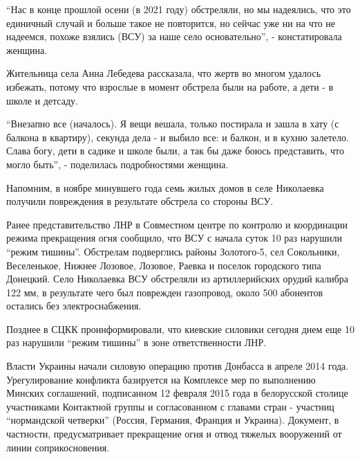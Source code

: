\enquote{Нас в конце прошлой осени (в 2021 году) обстреляли, но мы надеялись, что это
единичный случай и больше такое не повторится, но сейчас уже ни на что не
надеемся, похоже взялись (ВСУ) за наше село основательно}, - констатировала
женщина.


Жительница села Анна Лебедева рассказала, что жертв во многом удалось избежать,
потому что взрослые в момент обстрела были на работе, а дети - в школе и
детсаду.


\enquote{Внезапно все (началось). Я вещи вешала, только постирала и зашла в хату (с
балкона в квартиру), секунда дела - и выбило все: и балкон, и в кухню залетело.
Слава богу, дети в садике и школе были, а так бы даже боюсь представить, что
могло быть}, - поделилась подробностями женщина.


Напомним, в ноябре минувшего года семь жилых домов в селе Николаевка получили
повреждения в результате обстрела со стороны ВСУ.


Ранее представительство ЛНР в Совместном центре по контролю и координации
режима прекращения огня сообщило, что ВСУ с начала суток 10 раз нарушили \enquote{режим
тишины}. Обстрелам подверглись районы Золотого-5, сел Сокольники, Веселенькое,
Нижнее Лозовое, Лозовое, Раевка и поселок городского типа Донецкий. Село
Николаевка ВСУ обстреляли из артиллерийских орудий калибра 122 мм, в результате
чего был поврежден газопровод, около 500 абонентов остались без
электроснабжения.

Позднее в СЦКК проинформировали, что киевские силовики сегодня днем еще 10 раз
нарушили \enquote{режим тишины} в зоне ответственности ЛНР. 

Власти Украины начали силовую операцию против Донбасса в апреле 2014 года.
Урегулирование конфликта базируется на Комплексе мер по выполнению Минских
соглашений, подписанном 12 февраля 2015 года в белорусской столице участниками
Контактной группы и согласованном с главами стран - участниц \enquote{нормандской
четверки} (Россия, Германия, Франция и Украина). Документ, в частности,
предусматривает прекращение огня и отвод тяжелых вооружений от линии
соприкосновения. 
